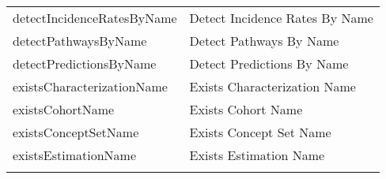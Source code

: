 \documentclass[
]{article}
\begin{document}
\begin{longtable}[]{@{}ll@{}}
\begin{minipage}[t]{0.46\columnwidth}\raggedright
detectIncidenceRatesByName\strut
\end{minipage} & \begin{minipage}[t]{0.48\columnwidth}\raggedright
Detect Incidence Rates By Name\strut
\end{minipage}\tabularnewline
\begin{minipage}[t]{0.46\columnwidth}\raggedright
detectPathwaysByName\strut
\end{minipage} & \begin{minipage}[t]{0.48\columnwidth}\raggedright
Detect Pathways By Name\strut
\end{minipage}\tabularnewline
\begin{minipage}[t]{0.46\columnwidth}\raggedright
detectPredictionsByName\strut
\end{minipage} & \begin{minipage}[t]{0.48\columnwidth}\raggedright
Detect Predictions By Name\strut
\end{minipage}\tabularnewline
\begin{minipage}[t]{0.46\columnwidth}\raggedright
existsCharacterizationName\strut
\end{minipage} & \begin{minipage}[t]{0.48\columnwidth}\raggedright
Exists Characterization Name\strut
\end{minipage}\tabularnewline
\begin{minipage}[t]{0.46\columnwidth}\raggedright
existsCohortName\strut
\end{minipage} & \begin{minipage}[t]{0.48\columnwidth}\raggedright
Exists Cohort Name\strut
\end{minipage}\tabularnewline
\begin{minipage}[t]{0.46\columnwidth}\raggedright
existsConceptSetName\strut
\end{minipage} & \begin{minipage}[t]{0.48\columnwidth}\raggedright
Exists Concept Set Name\strut
\end{minipage}\tabularnewline
\begin{minipage}[t]{0.46\columnwidth}\raggedright
existsEstimationName\strut
\end{minipage} & \begin{minipage}[t]{0.48\columnwidth}\raggedright
Exists Estimation Name\strut
\end{minipage}\tabularnewline
\begin{minipage}[t]{0.46\columnwidth}\raggedright

\end{minipage}
\end{longtable}
\end{document}
